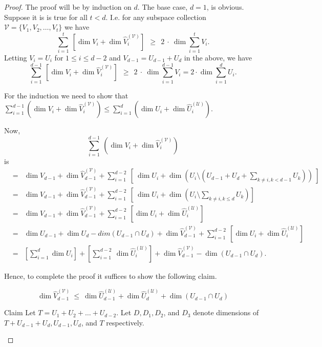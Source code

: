 \begin{proof}
The proof will be by induction on $d$. The base case, $d=1$, is
obvious. Suppose it is is true for all $t <d$. I.e. for any subspace
collection $\mathcal{V} = \{V_1, V_2, \ldots, V_t\}$ we have
\[
\sum_{i=1}^{t}~ \left[\dim V_i + \dim  \hat{V}_i^{(\mathcal{V})} \right]~~ \geq ~~2~\cdot ~\dim\sum_{i=1}^t V_i.
\]
Letting $V_i= U_i$ for $1\leq i \leq d-2$ and $V_{d-1}= U_{d-1}+U_d$
in the above, we have
\[
\sum_{i=1}^{d-1}~ \left[\dim V_i + \dim \hat{V}_i^{(\mathcal{V})}
  \right] ~~\geq ~~2~\cdot~ \dim\sum_{i=1}^{d-1} V_i = 2\cdot\dim\sum_{i=1}^d U_i. 
\]

For the induction we need to show that $\sum_{i=1}^{d-1} (\dim V_i +
\dim \hat{V}_i^{(\mathcal{V})})\leq \sum_{i=1}^{d} (\dim U_i + \dim
\hat{U}_i^{(\mathcal{U})})$.

Now, \[\sum_{i=1}^{d-1}~ (\dim V_i + \dim
  \hat{V}_i^{(\mathcal{V})})\] is
\begin{eqnarray*}
 &=& \dim V_{d-1} + \dim \hat{V}_{d-1}^{(\mathcal{V})} + \sum_{i=1}^{d-2}~ \left[  ~  \dim U_i + \dim(U_i \setminus ( U_{d-1}+U_{d} + \sum_{k \neq i, k<d-1}U_k ))~ \right]  \\
 &=&  \dim V_{d-1} + \dim \hat{V}_{d-1}^{(\mathcal{V})} + \sum_{i=1}^{d-2}~ \left[ ~\dim U_i + \dim( U_i \setminus \sum_{k \neq i, k\leq d} U_k) \right] \\
 &=&  \dim V_{d-1} + \dim \hat{V}_{d-1}^{(\mathcal{V})}+ \sum_{i=1}^{d-2} ~\left[ \dim U_i + \dim \hat{U}_i^{(\mathcal{U})} \right]\\
 &=& \dim U_{d-1} + \dim U_d -dim( U_{d-1} \cap U_d ) + \dim \hat{V}_{d-1}^{(\mathcal{V})}+ \sum_{i=1}^{d-2}~\left [ \dim U_i + \dim \hat{U}_i^{(\mathcal{U})} \right] \\
  &=& \left[ \sum_{i=1}^{d} \dim U_i \right] + \left[ \sum_{i=1}^{d-2}~ \dim \hat{U}_i^{(\mathcal{U})} \right] + \dim \hat{V}_{d-1}^{(\mathcal{V})}- \dim (U_{d-1} \cap U_d).
\end{eqnarray*}

%
%
%

Hence, to complete the proof it suffices to show the following claim.

\begin{claim}
\[ \dim \hat{V}_{d-1}^{(\mathcal{V})}~ \leq~ \dim  \hat{U}_{d-1}^{(\mathcal{U})}  + \dim  \hat{U}_d^{(\mathcal{U})} + \dim (U_{d-1} \cap U_d) \]
\end{claim}
\begin{proofof}{Claim}
Let $T= U_1 + U_2 + \ldots + U_{d-2}$. Let $D, D_1, D_2$, and $D_3$ denote
dimensions of $T+U_{d-1}+U_d, U_{d-1}, U_d$, and $T$ respectively.


\end{proofof}
\end{proof}
